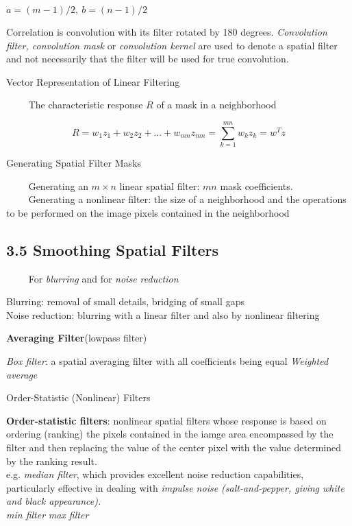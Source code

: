 \documentclass[]{article}
\begin{document}
\(a=(m-1)/2,\ b=(n-1)/2\)

Correlation is convolution with its filter rotated by 180 degrees.
\emph{Convolution filter, convolution mask} or \emph{convolution kernel}
are used to denote a spatial filter and not necessarily that the filter
will be used for true convolution.

Vector Representation of Linear Filtering

\(\quad\quad\) The characteristic response \(R\) of a mask in a
neighborhood

\[R = w_1 z_1 + w_2 z_2 + ... + w_{mn}z_{mn}
=\sum\limits^{mn}_{k=1}w_kz_k=w^Tz\]

Generating Spatial Filter Masks

\(\quad\quad\) Generating an \(m\times n\) linear spatial filter: \(mn\)
mask coefficients.\\
 \(\quad\quad\) Generating a nonlinear filter: the size of a
neighborhood and the operations to be performed on the image pixels
contained in the neighborhood

\subsection{3.5 Smoothing Spatial Filters}\label{header-n282}

\(\quad\quad\) For \emph{blurring} and for \emph{noise reduction}

Blurring: removal of small details, bridging of small gaps\\
 Noise reduction: blurring with a linear filter and also by nonlinear
filtering

\textbf{Averaging Filter}(lowpass filter)

\emph{Box filter}: a spatial averaging filter with all coefficients
being equal \emph{Weighted average}

Order-Statistic (Nonlinear) Filters

\textbf{Order-statistic filters}: nonlinear spatial filters whose
response is based on ordering (ranking) the pixels contained in the
iamge area encompassed by the filter and then replacing the value of the
center pixel with the value determined by the ranking result.\\
 e.g. \emph{median filter}, which provides excellent noise reduction
capabilities, particularly effective in dealing with \emph{impulse noise
(salt-and-pepper, giving white and black appearance).}\\
 \emph{min filter} \emph{max filter}
\end{document}
